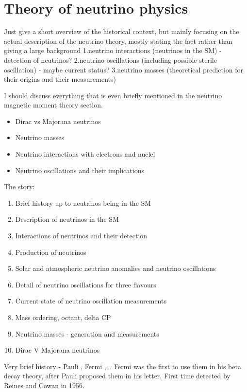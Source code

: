 \chapter{Theory of neutrino physics}\label{sec:NeutrinoTheory}

Just give a short overview of the historical context, but mainly focusing on the actual description of the neutrino theory, mostly stating the fact rather than giving a large background
1.neutrino interactions (neutrinos in the SM) - detection of neutrinos?
2.neutrino oscillations (including possible sterile oscillation) - maybe current status?
3.neutrino masses (theoretical prediction for their origins and their measurements)

I should discuss everything that is even briefly mentioned in the neutrino magnetic moment theory section.
\begin{itemize}
\item Dirac vs Majorana neutrinos
\item Neutrino masses
\item Neutrino interactions with electrons and nuclei
\item Neutrino oscillations and their implications
\end{itemize}

The story:
\begin{enumerate}
\item Brief history up to neutrinos being in the SM
\item Description of neutrinos in the SM
\item Interactions of neutrinos and their detection
\item Production of neutrinos
\item Solar and atmospheric neutrino anomalies and neutrino oscillations
\item Detail of neutrino oscillations for three flavours
\item Current state of neutrino oscillation measurements
\item Mass ordering, octant, delta CP
\item Neutrino masses - generation and measurements
\item Dirac V Majorana neutrinos
\end{enumerate}


Very brief history - Pauli \cite{PauliNeutrinoProposalLetter.pdf}, Fermi \cite{FermisTheoryOfBetaDecayOriginal.pdf,FermisTheoryOfBetaDecay.pdf},...
Fermi was the first to use them in his beta decay theory, after Pauli proposed them in his letter. First time detected by Reines and Cowan in 1956.

